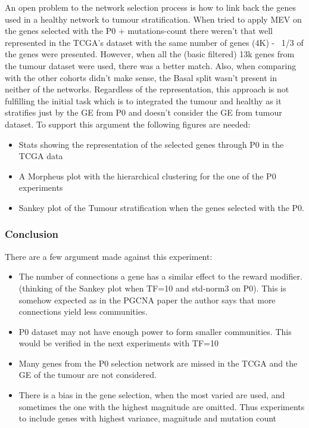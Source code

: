 An open problem to the network selection process is how to link back the genes used in a healthy network to tumour stratification. When tried to apply MEV on the genes selected with the P0 + mutations-count there weren't that well represented in the TCGA's dataset with the same number of genes (4K) - ~1/3 of the genes were presented. However, when all the (basic filtered) 13k genes from the tumour dataset were used, there was a better match. Also, when comparing with the other cohorts didn't make sense, the Basal split wasn't present in neither of the networks. Regardless of the representation, this approach is not fulfilling the initial task which is to integrated the tumour and healthy as it stratifies just by the GE from P0 and doesn't consider the GE from tumour dataset.
To support this argument the following figures are needed:
\begin{itemize}
    \item Stats showing the representation of the selected genes through P0 in the TCGA data
    \item A Morpheus plot with the hierarchical clustering for the one of the P0 experiments
    \item Sankey plot of the Tumour stratification when the genes selected with the P0.
\end{itemize}


\subsubsection{Conclusion}

There are a few argument made against this experiment:
\begin{itemize}
    \item The number of connections a gene has a similar effect to the reward modifier. (thinking of the Sankey plot when TF=10 and std-norm3 on P0). This is somehow expected as in the PGCNA paper the author says that more connections yield less communities.
    \item P0 dataset may not have enough power to form smaller communities. This would be verified in the next experiments with TF=10
    \item Many genes from the P0 selection network are missed in the TCGA and the GE of the tumour are not considered.
    \item There is a bias in the gene selection, when the most varied are used, and sometimes the one with the highest magnitude are omitted. Thus experiments to include genes with highest variance, magnitude and mutation count
\end{itemize}


